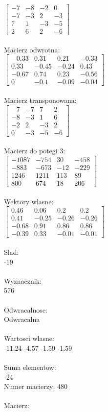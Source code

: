 \documentclass[a4paper,12pt]{article}
\begin{document}
$\begin{bmatrix} -7&-8&-2&0\\-7&-3&2&-3\\7&1&-3&-5\\2&6&2&-6 \end{bmatrix}$
\\
\\
Macierz odwrotna:\\

$\begin{bmatrix} -0.33&0.31&0.21&-0.33\\0.33&-0.45&-0.24&0.43\\-0.67&0.74&0.23&-0.56\\0&-0.1&-0.09&-0.04 \end{bmatrix}$
\\
\\
Macierz transponowana:\\

$\begin{bmatrix} -7&-7&7&2\\-8&-3&1&6\\-2&2&-3&2\\0&-3&-5&-6 \end{bmatrix}$
\\
\\
Macierz do potegi 3:\\

$\begin{bmatrix} -1087&-754&30&-458\\-883&-673&-12&-229\\1246&1211&113&89\\800&674&18&206 \end{bmatrix}$
\\
\\
Wektory wlasne:\\

$\begin{bmatrix} 0.46&0.06&0.2&0.2\\0.41&-0.25&-0.26&-0.26\\-0.68&0.91&0.86&0.86\\-0.39&0.33&-0.01&-0.01 \end{bmatrix}$
\\
\\
Slad:\\
-19
\\
\\
Wyznacznik:\\
576
\\
\\
Odwracalnosc:\\
Odwracalna
\\
\\
Wartosci wlasne:\\
-11.24 -4.57 -1.59 -1.59
\\
\\
Suma elementow:\\
-24
\\
\newpage
Numer macierzy:
480
\\
\\
Macierz:\\
\end{document}
